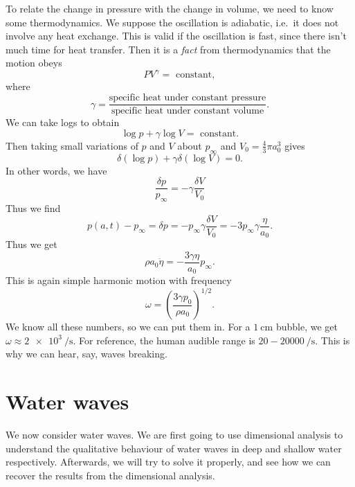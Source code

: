 \documentclass[a4paper]{article}
\begin{document}
\begin{eg}
  To relate the change in pressure with the change in volume, we need to know some thermodynamics. We suppose the oscillation is adiabatic, i.e.\ it does not involve any heat exchange. This is valid if the oscillation is fast, since there isn't much time for heat transfer. Then it is a \emph{fact} from thermodynamics that the motion obeys
  \[
    PV^\gamma =\text{ constant},
  \]
  where
  \[
    \gamma = \frac{\text{specific heat under constant pressure}}{\text{specific heat under constant volume}}.
  \]
  We can take logs to obtain
  \[
    \log p + \gamma \log V = \text{ constant}.
  \]
  Then taking small variations of $p$ and $V$ about $p_\infty$ and $V_0 = \frac{4}{3} \pi a_0^3$ gives
  \[
    \delta (\log p) + \gamma \delta(\log V) = 0.
  \]
  In other words, we have
  \[
    \frac{\delta p}{p_\infty} = -\gamma \frac{\delta V}{V_0}
  \]
  Thus we find
  \[
    p(a, t) - p_\infty = \delta p = -p_\infty \gamma \frac{\delta V}{V_0} = -3p_\infty\gamma \frac{\eta}{a_0}.
  \]
  Thus we get
  \[
    \rho a_0 \ddot{\eta} = -\frac{3 \gamma \eta}{a_0} p_\infty.
  \]
  This is again simple harmonic motion with frequency
  \[
    \omega = \left(\frac{3\gamma p_0}{\rho a_0}\right)^{1/2}.
  \]
  We know all these numbers, so we can put them in. For a $\SI{1}{\centi\meter}$ bubble, we get $\omega \approx \SI{2e3}{\per\second}$. For reference, the human audible range is $20 - \SI{20000}{\per\second}$. This is why we can hear, say, waves breaking.
\end{eg}

\section{Water waves}
We now consider water waves. We are first going to use dimensional analysis to understand the qualitative behaviour of water waves in deep and shallow water respectively. Afterwards, we will try to solve it properly, and see how we can recover the results from the dimensional analysis.
\begin{center}
\end{center}
\end{document}
